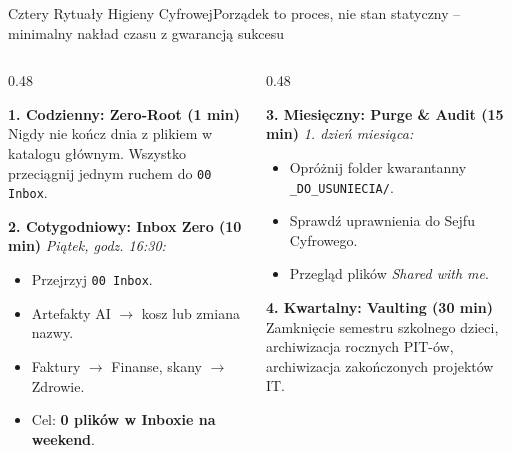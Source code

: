 \documentclass[aspectratio=169, 10pt]{beamer}
\begin{document}
\begin{frame}{Cztery Rytuały Higieny Cyfrowej}{Porządek to proces, nie stan statyczny -- minimalny nakład czasu z gwarancją sukcesu}
  \begin{columns}[T]
    \begin{column}{0.48\textwidth}
      \begin{block}{\textbf{1. Codzienny: Zero-Root (1 min)}}
        Nigdy nie kończ dnia z plikiem w katalogu głównym. Wszystko przeciągnij jednym ruchem do \texttt{00 Inbox}.
      \end{block}

      \vspace{0.2cm}
      \begin{exampleblock}{\textbf{2. Cotygodniowy: Inbox Zero (10 min)}}
        \textit{Piątek, godz. 16:30:}
        \begin{itemize}\scriptsize
          \item Przejrzyj \texttt{00 Inbox}.
          \item Artefakty AI $\rightarrow$ kosz lub zmiana nazwy.
          \item Faktury $\rightarrow$ Finanse, skany $\rightarrow$ Zdrowie.
          \item Cel: \textbf{0 plików w Inboxie na weekend}.
        \end{itemize}
      \end{exampleblock}
    \end{column}

    \begin{column}{0.48\textwidth}
      \begin{block}{\textbf{3. Miesięczny: Purge \& Audit (15 min)}}
        \textit{1. dzień miesiąca:}
        \begin{itemize}\scriptsize
          \item Opróżnij folder kwarantanny \texttt{\_DO\_USUNIECIA/}.
          \item Sprawdź uprawnienia do Sejfu Cyfrowego.
          \item Przegląd plików \textit{Shared with me}.
        \end{itemize}
      \end{block}

      \vspace{0.2cm}
      \begin{block}{\textbf{4. Kwartalny: Vaulting (30 min)}}
        Zamknięcie semestru szkolnego dzieci, archiwizacja rocznych PIT-ów, archiwizacja zakończonych projektów IT.
      \end{block}
    \end{column}
  \end{columns}
\end{frame}
\end{document}

